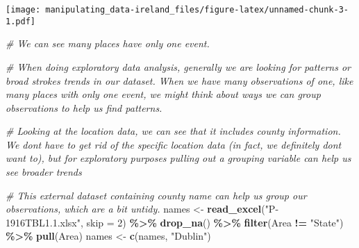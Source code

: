 \documentclass[
]{article}
\newenvironment{Shaded}{\begin{snugshade}}{\end{snugshade}}
\newcommand{\AttributeTok}[1]{\textcolor[rgb]{0.13,0.29,0.53}{#1}}
\newcommand{\CommentTok}[1]{\textcolor[rgb]{0.56,0.35,0.01}{\textit{#1}}}
\newcommand{\DecValTok}[1]{\textcolor[rgb]{0.00,0.00,0.81}{#1}}
\newcommand{\FunctionTok}[1]{\textcolor[rgb]{0.13,0.29,0.53}{\textbf{#1}}}
\newcommand{\NormalTok}[1]{#1}
\newcommand{\OtherTok}[1]{\textcolor[rgb]{0.56,0.35,0.01}{#1}}
\newcommand{\SpecialCharTok}[1]{\textcolor[rgb]{0.81,0.36,0.00}{\textbf{#1}}}
\newcommand{\StringTok}[1]{\textcolor[rgb]{0.31,0.60,0.02}{#1}}
\begin{document}
\texttt{[image: manipulating\_data-ireland\_files/figure-latex/unnamed-chunk-3-1.pdf]}

\begin{Shaded}
\begin{Highlighting}[]
\CommentTok{\# We can see many places have only one event. }

\CommentTok{\# When doing exploratory data analysis, generally we are looking for patterns or broad strokes trends in our dataset. When we have many observations of one, like many places with only one event, we might think about ways we can group observations to help us find patterns. }

\CommentTok{\# Looking at the location data, we can see that it includes county information. We don\textquotesingle{}t have to get rid of the specific location data (in fact, we definitely don\textquotesingle{}t want to), but for exploratory purposes pulling out a grouping variable can help us see broader trends}

\CommentTok{\# This external dataset containing county name can help us group our observations, which are a bit untidy.}
\NormalTok{names }\OtherTok{\textless{}{-}} \FunctionTok{read\_excel}\NormalTok{(}\StringTok{"P{-}1916TBL1.1.xlsx"}\NormalTok{, }\AttributeTok{skip =} \DecValTok{2}\NormalTok{) }\SpecialCharTok{\%\textgreater{}\%} \FunctionTok{drop\_na}\NormalTok{() }\SpecialCharTok{\%\textgreater{}\%} \FunctionTok{filter}\NormalTok{(Area }\SpecialCharTok{!=} \StringTok{"State"}\NormalTok{) }\SpecialCharTok{\%\textgreater{}\%} \FunctionTok{pull}\NormalTok{(Area)}
\NormalTok{names }\OtherTok{\textless{}{-}} \FunctionTok{c}\NormalTok{(names, }\StringTok{"Dublin"}\NormalTok{)}


\end{Highlighting}
\end{Shaded}
\end{document}

